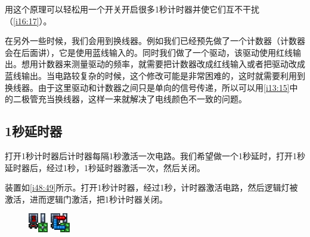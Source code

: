 用这个原理可以轻松用一个开关开启很多1秒计时器并使它们互不干扰（\autoref{i16:17}）。

\begin{figure}[!ht]
\begin{center}
\end{center}
\caption{}
\label{i16:17}
\end{figure}

在另外一些时候，我们会用到换线器。例如我们已经预先做了一个计数器（计数器会在后面讲），它是使用蓝线输入的。同时我们做了一个驱动，该驱动使用红线输出。想用计数器来测量驱动的频率，就需要把计数器改成红线输入或者把驱动改成蓝线输出。当电路较复杂的时候，这个修改可能是非常困难的，这时就需要利用到换线器。由于这里驱动和计数器之间只是单向的信号传递，所以可以用\autoref{i13:15}中的二极管充当换线器，这样一来就解决了电线颜色不一致的问题。

\subsection{1秒延时器}

打开1秒计时器后计时器每隔1秒激活一次电路。我们希望做一个1秒延时，打开1秒延时器后，经过1秒，1秒延时器激活一次，然后关闭。

装置如\autoref{i48:49}所示。打开1秒计时器，经过1秒，计时器激活电路，然后逻辑灯被激活，进而逻辑门激活，把1秒计时器关闭。

\begin{figure}[!ht]
\begin{center}
\includegraphics{images/48.png}
\qquad
\includegraphics{images/49.png}
\end{center}
\caption{}
\label{i48:49}
\end{figure}

